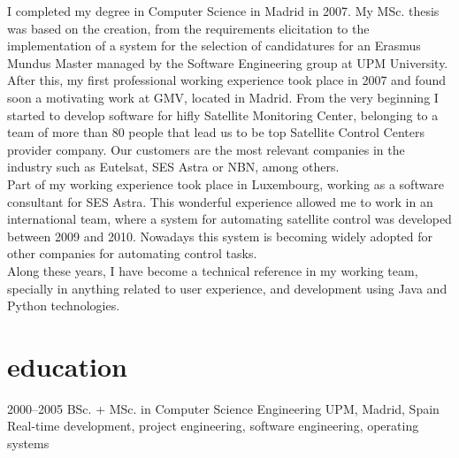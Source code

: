 \documentclass[]{friggeri-cv}
\begin{document}
{\headingfont I completed my degree} in Computer Science in Madrid in 2007. My MSc. thesis was based on 
the creation, from the requirements elicitation to the implementation of a system for the selection of candidatures for an
Erasmus Mundus Master managed by the Software Engineering group at UPM University. \\
{\headingfont After this, my first professional working experience} took place in 2007 and found soon a motivating work 
at GMV, located in Madrid. From the very beginning I started to develop software for hifly Satellite Monitoring Center,
belonging to a team of more than 80 people that lead us to be top Satellite Control Centers provider company. 
Our customers are the most relevant companies in the industry such as Eutelsat, SES Astra or NBN, among others. \\
{\headingfont Part of my working experience took place in Luxembourg,} working as a software consultant for SES Astra.
This wonderful experience allowed me to work in an international team, where a system for automating satellite control
was developed between 2009 and 2010. Nowadays this system is becoming widely adopted for other companies for automating
control tasks. \\
{\headingfont Along these years,} I have become a technical reference in my working team, specially in anything related
to user experience, and development using Java and Python technologies. \\


\section{education}

\begin{entrylist}
\entry
{2000--2005}
{BSc. + MSc. {\normalfont in Computer Science Engineering}}
{UPM, Madrid, Spain}
{Real-time development, project engineering, software engineering, operating systems}
\end{entrylist}


\end{document}
